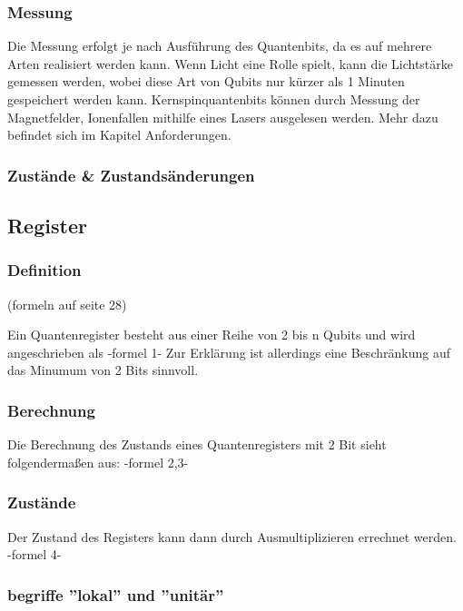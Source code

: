 \subsubsection{Messung}

Die Messung erfolgt je nach Ausführung des Quantenbits, da es auf mehrere Arten realisiert werden kann. Wenn Licht eine Rolle spielt, kann die Lichtstärke gemessen werden, wobei diese Art von Qubits nur kürzer als 1 Minuten gespeichert werden kann. Kernspinquantenbits können durch Messung der Magnetfelder, Ionenfallen mithilfe eines Lasers ausgelesen werden. Mehr dazu befindet sich im Kapitel Anforderungen.

\subsubsection{Zustände \& Zustandsänderungen}


\subsection{Register}
\label{sec:Register}

\subsubsection{Definition}
(formeln auf seite 28)

Ein Quantenregister besteht aus einer Reihe von 2 bis n Qubits und wird angeschrieben als -formel 1-
Zur Erklärung ist allerdings eine Beschränkung auf das Minumum von 2 Bits sinnvoll.

\subsubsection{Berechnung}

Die Berechnung des Zustands eines Quantenregisters mit 2 Bit sieht folgendermaßen aus:
-formel 2,3-

\subsubsection{Zustände}

Der Zustand des Registers kann dann durch Ausmultiplizieren errechnet werden. -formel 4-

\subsubsection{begriffe ''lokal'' und ''unitär''}

